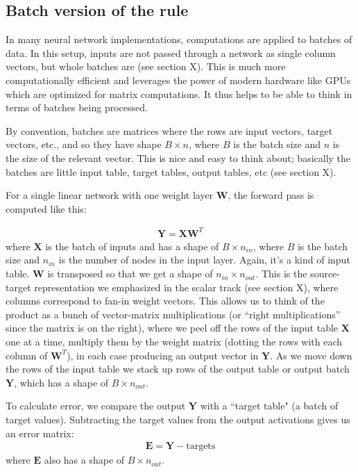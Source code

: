 \subsection{Batch version of the rule}

In many neural network implementations, computations are applied to batches of data. In this setup, inputs are not passed through a network as single column vectors, but whole batches are (see section X). This is much more computationally efficient and leverages the power of modern hardware like GPUs which are optimized for matrix computations.  It thus helps to be able to think in terms of batches being processed.

By convention, batches are matrices where the rows are input vectors, target vectors, etc., and so they have shape $B \times n$, where $B$ is the batch size and $n$ is the size of the relevant vector. This is nice and easy to think about; basically the batches are little input table, target tables, output tables, etc (see section X).

For a single linear network with one weight layer $\mathbf{W}$, the forward pass is computed like this:

\begin{eqnarray}
\mathbf{Y} = \mathbf{X} \mathbf{W}^T
\end{eqnarray}
where $\mathbf{X}$ is the batch of inputs and has a shape of $B \times n_{in}$, where $B$ is the batch size and $n_{in}$ is the number of nodes in the input layer. Again, it's a kind of input table. $\mathbf{W}$ is transposed so that we get a shape of $n_{in} \times n_{out}$. This is the source-target representation we emphasized in the scalar track (see section X), where columns correspond to fan-in weight vectors. This allows us to think of the product as a bunch of vector-matrix multiplications (or ``right multiplications'' since the matrix is on the right), where we peel off the rows of the input table $\mathbf{X}$ one at a time, multiply them by the weight matrix (dotting the rows with each column of $\mathbf{W}^T$), in each case producing an output vector in $\mathbf{Y}$. As we move down the rows of the input table we stack up rows of the output table or output batch $\mathbf{Y}$, which has a shape of $B \times n_{out}$.

To calculate error, we compare the output $\mathbf{Y}$ with a ``target table" (a batch of target values). Subtracting the target values from the output activations gives us an error matrix:
\begin{eqnarray}
\mathbf{E} = \mathbf{Y} - \text{targets}
\end{eqnarray}
where $\mathbf{E}$ also has a shape of $B \times n_{out}$.

